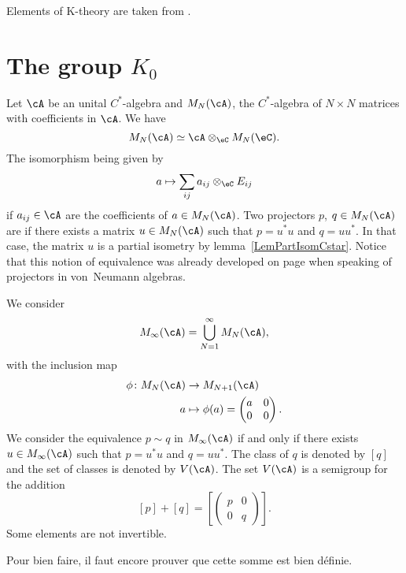 Elements of K-theory are taken from \cite{VB_and_K,Landi}.

%
\section{The group \texorpdfstring{$K_0$}{K0}}
%

Let $\cA$ be an unital $C^*$-algebra and $ M_N(\cA)$, the $C^*$-algebra of $N\times N$ matrices with coefficients in $\cA$. We have
\begin{equation}
	M_N(\cA)\simeq \cA\otimes_{\eC} M_N(\eC).
\end{equation}
The isomorphism being given by
\[
	a\mapsto \sum_{ij}a_{ij}\otimes_{\eC}E_{ij}
\]
if $a_{ij}\in\cA$ are the coefficients of $a\in M_N(\cA)$. Two projectors $p$, $q\in M_N(\cA)$ are  if there exists a matrix $u\in M_N(\cA)$ such that $p=u^*u$ and $q=uu^*$. In that case, the matrix $u$ is a partial isometry by lemma~\ref{LemPartIsomCstar}. Notice that this notion of equivalence was already developed on page \pageref{PgEaivVNMurray} when speaking of projectors in von~Neumann algebras.

We consider
\[
	M_{\infty}(\cA)=\bigcup_{N=1}^{\infty}M_N(\cA),
\]
with the inclusion map
\begin{equation}
	\begin{aligned}
		\phi\colon M_N(\cA) & \to M_{N+1}(\cA) \\
		a                   & \mapsto \phi(a)=
		\begin{pmatrix}
			a & 0 \\
			0 & 0
		\end{pmatrix}.
	\end{aligned}
\end{equation}
We consider the equivalence $p\sim q$ in $M_{\infty}(\cA)$ if and only if there exists $u\in M_{\infty}(\cA)$ such that $p=u^*u$ and $q=uu^*$. The class of $q$ is denoted by $[q]$ and the set of classes is denoted by $V(\cA)$. The set $V(\cA)$ is a semigroup for the addition
\[
	[p]+[q]=
	\left[
		\begin{pmatrix}
			p & 0 \\
			0 & q
		\end{pmatrix}
		\right].
\]
Some elements are not invertible.

\begin{probleme}
	Pour bien faire, il faut encore prouver que cette somme est bien définie.
\end{probleme}


